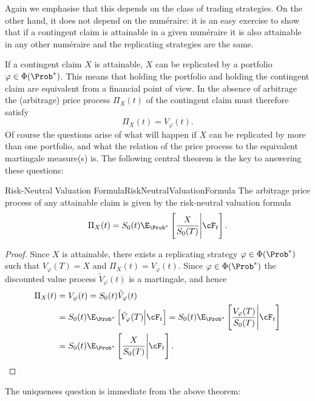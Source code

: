 Again we emphasise that this depends on the class of trading strategies. On the other hand, it does not depend on the num\'{e}raire: it is an easy exercise to show that if a contingent claim is attainable in a given num\'{e}raire it is also attainable in any other num\'{e}raire and the replicating strategies are the same.

If a contingent claim \(X\) is attainable, \(X\) can be replicated by a portfolio \(\varphi \in \Phi(\Prob^*)\). This means that holding the portfolio and holding the contingent claim are equivalent from a financial point of view. In the absence of arbitrage the (arbitrage) price process \(\Pi_X(t)\) of the contingent claim must therefore satisfy
\[
	\Pi_X(t) = V_{\varphi}(t).
\]
Of course the questions arise of what will happen if \(X\) can be replicated by more than one portfolio, and what the relation of the price process to the equivalent martingale measure(s) is. The following central theorem is the key to answering these questions:

\begin{thm}{Risk-Neutral Valuation Formula}{RiskNeutralValuationFormula}
	The arbitrage price process of any attainable claim is given by the risk-neutral valuation formula
	\begin{equation}
		\Pi_X(t) = S_0(t)\E_{\Prob^*} \left[ \frac{X}{S_0(T)} \Bigg| \cF_t \right].
	\end{equation}
\end{thm}

\begin{proof}
	Since \(X\) is attainable, there exists a replicating strategy \(\varphi \in \Phi(\Prob^*)\) such that \(V_{\varphi}(T) = X\) and \(\Pi_X(t) = V_{\varphi}(t)\). Since \(\varphi \in \Phi(\Prob^*)\) the discounted value process \(\tilde{V}_{\varphi}(t)\) is a martingale, and hence
	\begin{align*}
		\Pi_X(t) & = V_{\varphi}(t) = S_0(t)\tilde{V}_{\varphi}(t)                                                                                                       \\
		         & = S_0(t)\E_{\Prob^*} \left[ \tilde{V}_{\varphi}(T) \Big| \cF_t \right] = S_0(t)\E_{\Prob^*} \left[ \frac{V_{\varphi}(T)}{S_0(T)} \Bigg| \cF_t \right] \\
		         & = S_0(t)\E_{\Prob^*} \left[ \frac{X}{S_0(T)} \Bigg| \cF_t \right].
	\end{align*}
\end{proof}

The uniqueness question is immediate from the above theorem:

